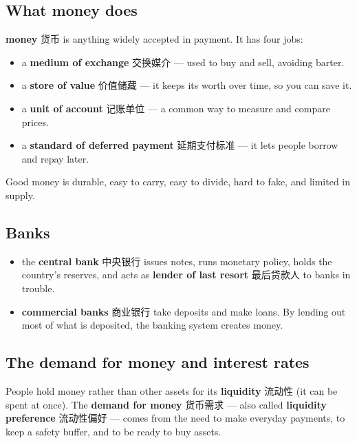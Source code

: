 \documentclass[11pt]{article}
\begin{document}
\subsection*{What money does}

\textbf{money} 货币 is anything widely accepted in payment. It has four jobs:

\begin{itemize}
\item a \textbf{medium of exchange} 交换媒介 — used to buy and sell, avoiding barter.

\item a \textbf{store of value} 价值储藏 — it keeps its worth over time, so you can save it.

\item a \textbf{unit of account} 记账单位 — a common way to measure and compare prices.

\item a \textbf{standard of deferred payment} 延期支付标准 — it lets people borrow and repay later.

\end{itemize}

Good money is durable, easy to carry, easy to divide, hard to fake, and limited in supply.

\subsection*{Banks}

\begin{itemize}
\item the \textbf{central bank} 中央银行 issues notes, runs monetary policy, holds the country's reserves, and acts as \textbf{lender of last resort} 最后贷款人 to banks in trouble.

\item \textbf{commercial banks} 商业银行 take deposits and make loans. By lending out most of what is deposited, the banking system creates money.

\end{itemize}

\subsection*{The demand for money and interest rates}

People hold money rather than other assets for its \textbf{liquidity} 流动性 (it can be spent at once). The \textbf{demand for money} 货币需求 — also called \textbf{liquidity preference} 流动性偏好 — comes from the need to make everyday payments, to keep a safety buffer, and to be ready to buy assets.
\end{document}
